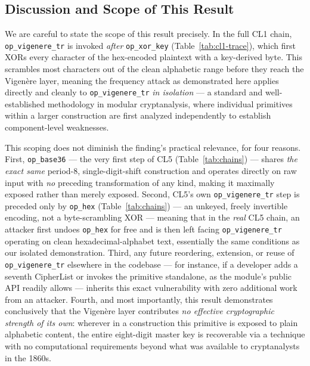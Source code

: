 \documentclass[11pt]{article}
\begin{document}
\subsection{Discussion and Scope of This Result}

We are careful to state the scope of this result precisely. In the
full CL1 chain, \texttt{op\_vigenere\_tr} is invoked \emph{after}
\texttt{op\_xor\_key} (Table~\ref{tab:cl1-trace}), which first XORs
every character of the hex-encoded plaintext with a key-derived byte.
This scrambles most characters out of the clean alphabetic range before
they reach the Vigen\`ere layer, meaning the frequency attack as
demonstrated here applies directly and cleanly to
\texttt{op\_vigenere\_tr} \emph{in isolation} --- a standard and
well-established methodology in modular cryptanalysis, where individual
primitives within a larger construction are first analyzed
independently to establish component-level weaknesses.

This scoping does not diminish the finding's practical relevance, for
four reasons. First, \texttt{op\_base36} --- the very first step of CL5
(Table~\ref{tab:chains}) --- shares \emph{the exact same} period-8,
single-digit-shift construction and operates directly on raw input with
\emph{no} preceding transformation of any kind, making it maximally
exposed rather than merely exposed. Second, CL5's own
\texttt{op\_vigenere\_tr} step is preceded only by \texttt{op\_hex}
(Table~\ref{tab:chains}) --- an unkeyed, freely invertible encoding, not
a byte-scrambling XOR --- meaning that in the \emph{real} CL5 chain, an
attacker first undoes \texttt{op\_hex} for free and is then left facing
\texttt{op\_vigenere\_tr} operating on clean hexadecimal-alphabet text,
essentially the same conditions as our isolated demonstration. Third,
any future reordering, extension, or reuse of \texttt{op\_vigenere\_tr}
elsewhere in the codebase --- for instance, if a developer adds a seventh
CipherList or invokes the primitive standalone, as the module's public
API readily allows --- inherits this exact vulnerability with zero
additional work from an attacker. Fourth, and most importantly, this
result demonstrates conclusively that the Vigen\`ere layer contributes
\emph{no effective cryptographic strength of its own}: wherever in a
construction this primitive is exposed to plain alphabetic content, the
entire eight-digit master key is recoverable via a technique with no
computational requirements beyond what was available to cryptanalysts
in the 1860s.

\end{document}
